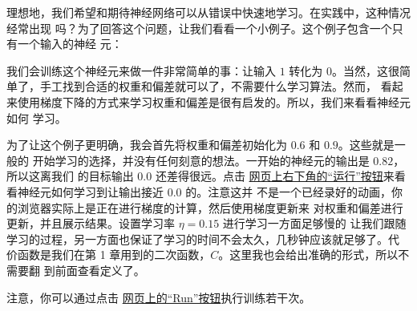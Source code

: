 理想地，我们希望和期待神经网络可以从错误中快速地学习。在实践中，这种情况经常出现
吗？为了回答这个问题，让我们看看一个小例子。这个例子包含一个只有一个输入的神经
元：

\begin{center}
\end{center}

我们会训练这个神经元来做一件非常简单的事：让输入 $1$ 转化为
$0$。当然，这很简单了，手工找到合适的权重和偏差就可以了，不需要什么学习算法。然而，
看起来使用梯度下降的方式来学习权重和偏差是很有启发的。所以，我们来看看神经元如何
学习。

为了让这个例子更明确，我会首先将权重和偏差初始化为 $0.6$ 和 $0.9$。这些就是一般的
开始学习的选择，并没有任何刻意的想法。一开始的神经元的输出是 $0.82$，所以这离我们
的目标输出 $0.0$ 还差得很远。点击%
\href{http://neuralnetworksanddeeplearning.com/chap3.html#the_cross-entropy_cost_function}{
  网页上右下角的``运行''按钮}来看看神经元如何学习到让输出接近 $0.0$ 的。注意这并
不是一个已经录好的动画，你的浏览器实际上是正在进行梯度的计算，然后使用梯度更新来
对权重和偏差进行更新，并且展示结果。设置学习率 $\eta=0.15$ 进行学习一方面足够慢的
让我们跟随学习的过程，另一方面也保证了学习的时间不会太久，几秒钟应该就足够了。代
价函数是我们在第 1 章用到的二次函数，$C$。这里我也会给出准确的形式，所以不需要翻
到前面查看定义了。


\begin{center}
\end{center}

注意，你可以通过点击%
\href{http://neuralnetworksanddeeplearning.com/chap3.html#the_cross-entropy_cost_function}{
  网页上的``Run''按钮}执行训练若干次。

